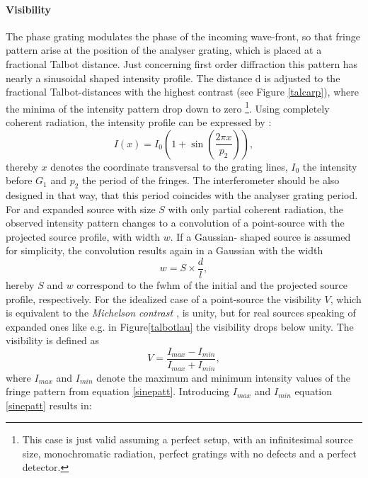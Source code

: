 \paragraph{Visibility} The phase grating modulates the phase of the incoming wave-front, so that fringe pattern arise at the position of the analyser grating, which is placed at a fractional Talbot distance. 
Just concerning first order diffraction \citep{WeitkampPfeiffer2006} this pattern has nearly a sinusoidal shaped intensity profile. The distance d is adjusted to the fractional Talbot-distances with the highest contrast (see Figure \ref{talcarp}), where the minima of the intensity pattern drop down to zero \footnote{This case is just valid assuming a perfect setup, with an infinitesimal source size, monochromatic radiation, perfect gratings with no defects and a perfect detector.}. Using completely coherent radiation, the intensity profile can be expressed by \citep{WeitkampPfeiffer2006}: 
\begin{equation}\label{sinepatt}
I(x) = I_{0}(1+ \sin(\frac{2\pi x}{p_{2}})), 
\end{equation} 
thereby $x$ denotes the coordinate transversal to the grating lines, $I_{0}$ the intensity before $G_{1}$ and $p_{2}$ the period of the fringes. The interferometer should be also designed in that way, that this period coincides with the analyser grating period. For and expanded source with size $S$ with only partial coherent radiation, the observed intensity pattern changes to a convolution of a point-source with the projected source profile, with width $w$. If a Gaussian- shaped source is assumed for simplicity, the convolution results again in a Gaussian with the width
\begin{equation}\label{projsize}
w = S \times \frac{d}{l},
\end{equation}
hereby $S$ and $w$ correspond to the \gls{fwhm} of the initial and the projected source profile, respectively.  For the idealized case of a point-source the visibility $V$, which is equivalent to the \textit{Michelson contrast \citep{michelson1995studies}}, is unity, but for real sources speaking of expanded ones like e.g. in Figure\ref{talbotlau} the visibility drops below unity. The visibility is defined as 
\begin{equation} \label{visibility}
V = \frac{I_{max}-I_{min}}{I_{max}+I_{min}},
\end{equation}
where $I_{max}$ and $I_{min}$ denote the maximum and minimum intensity values of the fringe pattern from equation \ref{sinepatt}. Introducing $I_{max}$ and $I_{min}$ equation \ref{sinepatt} results in:
